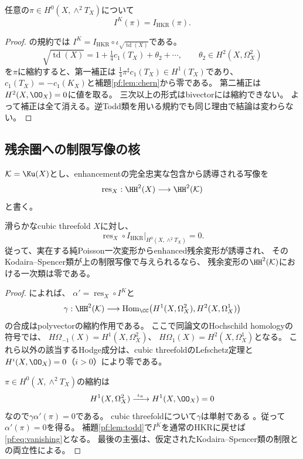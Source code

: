 \begin{lemma}
\label{pf:lem:todd}
任意の$\pi\in H^0(X,\wedge^2T_X)$について
\[
 I^K(\pi)=I_{\mathrm{HKR}}(\pi).
\]
\end{lemma}
\begin{proof}
\cite[Theorem 1.4]{PFCRVdB}の規約では
$I^K=I_{\mathrm{HKR}}\circ\iota_{\sqrt{\operatorname{td}(X)}}$である。
\[
 \sqrt{\operatorname{td}(X)}
 =1+\tfrac14c_1(T_X)+\theta_2+\cdots,
 \qquad\theta_2\in H^2(X,\Omega_X^2)
\]
を$\pi$に縮約すると、第一補正は
$\tfrac14\pi^\sharp c_1(T_X)\in H^1(T_X)$であり、
$c_1(T_X)=-c_1(K_X)$と補題\ref{pf:lem:chern}から零である。
第二補正は$H^2(X,\OO_X)=0$に値を取る。
三次以上の形式はbivectorには縮約できない。
よって補正は全て消える。逆Todd類を用いる規約でも同じ理由で結論は変わらない。
\end{proof}

\subsection{残余圏への制限写像の核}
$\mathcal K=\Ku(X)$とし、enhancementの完全忠実な包含から誘導される写像を
\[
 \operatorname{res}_X:\HH^2(X)\longrightarrow\HH^2(\mathcal K)
\]
と書く。

\begin{proposition}[Poisson方向の一次消滅]
\label{pf:prop:vanishing}
滑らかなcubic threefold $X$に対し、
\[
 \operatorname{res}_X\circ I_{\mathrm{HKR}}
 \big|_{H^0(X,\wedge^2T_X)}=0.
 \tag{PV}\label{pf:eq:vanishing}
\]
従って、実在する純Poisson一次変形からenhanced残余変形が誘導され、
そのKodaira--Spencer類が上の制限写像で与えられるなら、
残余変形の$\HH^2(\mathcal K)$における一次類は零である。
\end{proposition}
\begin{proof}
\cite[Theorem 3.11]{JLLZER}によれば、
$\alpha'=\operatorname{res}_X\circ I^K$と
\[
 \gamma:\HH^2(\mathcal K)\longrightarrow
 \operatorname{Hom}_{\CC}
 \bigl(H^1(X,\Omega_X^2),H^2(X,\Omega_X^1)\bigr)
\]
の合成はpolyvectorの縮約作用である。
ここで同論文のHochschild homologyの符号では、
$H\Omega_{-1}(X)=H^1(X,\Omega_X^2)$、
$H\Omega_1(X)=H^2(X,\Omega_X^1)$となる。
これら以外の該当するHodge成分は、cubic threefoldのLefschetz定理と
$H^i(X,\OO_X)=0$（$i>0$）により零である。

$\pi\in H^0(X,\wedge^2T_X)$の縮約は
\[
 H^1(X,\Omega_X^2)\xrightarrow{\ \iota_\pi\ }
 H^1(X,\OO_X)=0
\]
なので$\gamma\alpha'(\pi)=0$である。
cubic threefoldについて$\gamma$は単射である
\cite[Theorem 4.4(2)]{JLLZER}。従って$\alpha'(\pi)=0$を得る。
補題\ref{pf:lem:todd}で$I^K$を通常のHKRに戻せば
\eqref{pf:eq:vanishing}となる。
最後の主張は、仮定されたKodaira--Spencer類の制限との両立性による。
\end{proof}

